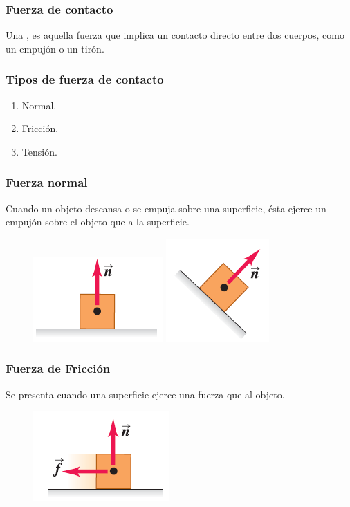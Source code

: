 \documentclass[14pt]{beamer}
\begin{document}
\begin{frame}
\frametitle{Fuerza de contacto}
Una , es aquella fuerza que implica un contacto directo entre dos cuerpos, como un empujón o un tirón.
\end{frame}
\begin{frame}
\frametitle{Tipos de fuerza de contacto}
\begin{enumerate}[<+->]
\item Normal.
\item Fricción.
\item Tensión.
\end{enumerate}
\end{frame}
\begin{frame}
\frametitle{Fuerza normal}
Cuando un objeto descansa o se empuja sobre una superficie, ésta ejerce un empujón sobre el objeto que  a la superficie.
\pause
\begin{figure}
    \centering
    \includegraphics[scale=0.6]{Imagenes/Fuerza_02.png}
    \hspace*{1.5cm}
    \includegraphics[scale=0.6]{Imagenes/Fuerza_03.png}
\end{figure}
\end{frame}
\begin{frame}
\frametitle{Fuerza de Fricción}
Se presenta cuando una superficie ejerce una fuerza que  al objeto.
\begin{figure}
    \centering
    \includegraphics[scale=0.7]{Imagenes/Fuerza_04.png}
\end{figure}
\end{frame}
\end{document}

